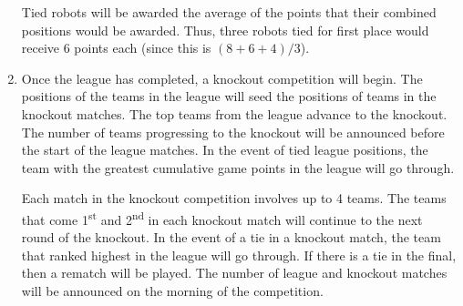 \begin{enumerate}
      Tied robots will be awarded the average of the points that their combined positions would be awarded.
      Thus, three robots tied for first place would receive 6 points each (since this is $(8+6+4)/3$).

\item Once the league has completed, a knockout competition will begin.
      The positions of the teams in the league will seed the positions of teams in the knockout matches.
      The top teams from the league advance to the knockout.
      The number of teams progressing to the knockout will be announced before the start of the league matches.
      In the event of tied league positions, the team with the greatest cumulative game points in the league will go through.

      Each match in the knockout competition involves up to 4 teams.
      The teams that come 1\textsuperscript{st} and 2\textsuperscript{nd} in each knockout match will continue to the next round of the knockout.
      In the event of a tie in a knockout match, the team that ranked highest in the league will go through.
      If there is a tie in the final, then a rematch will be played.
      The number of league and knockout matches will be announced on the morning of the competition.

\end{enumerate}
